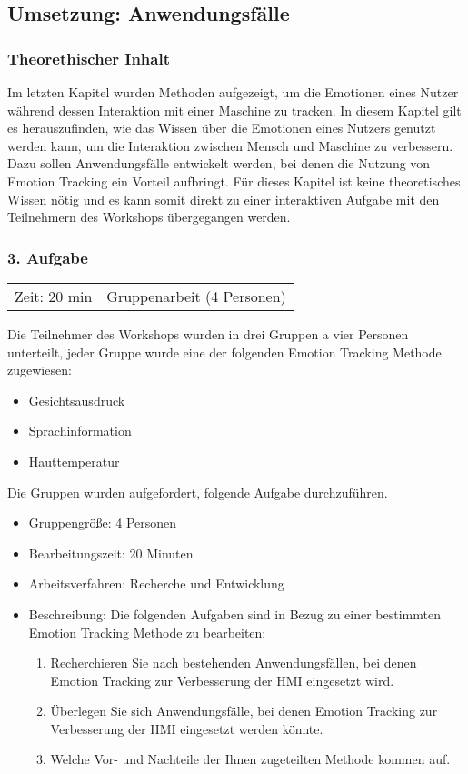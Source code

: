 \subsection{Umsetzung: Anwendungsfälle}\label{Umsetzung_Anwendungsfaelle}
\subsubsection*{Theorethischer Inhalt}
Im letzten Kapitel wurden Methoden aufgezeigt, um die Emotionen eines Nutzer während dessen Interaktion mit einer Maschine zu tracken. In diesem Kapitel gilt es herauszufinden, wie das Wissen über die Emotionen eines Nutzers genutzt werden kann, um die Interaktion zwischen Mensch und Maschine zu verbessern. Dazu sollen Anwendungsfälle entwickelt werden, bei denen die Nutzung von Emotion Tracking ein Vorteil aufbringt. Für dieses Kapitel ist keine theoretisches Wissen nötig und es kann somit direkt zu einer interaktiven Aufgabe mit den Teilnehmern des Workshops übergegangen werden.
\newline
\subsubsection*{3. Aufgabe}
\begin{tabular}{c c }
	Zeit: 20 min & Gruppenarbeit (4 Personen)\\
\end{tabular}

Die Teilnehmer des Workshops wurden in drei Gruppen a vier Personen unterteilt, jeder Gruppe wurde eine der folgenden Emotion Tracking Methode zugewiesen:
\begin{itemize}
	\item Gesichtsausdruck
	\item Sprachinformation
	\item Hauttemperatur
\end{itemize}
Die Gruppen wurden aufgefordert, folgende Aufgabe durchzuführen.
\begin{itemize}
	\item Gruppengröße: 4 Personen
	\item Bearbeitungszeit: 20 Minuten
	\item Arbeitsverfahren: Recherche und Entwicklung
	\item Beschreibung: Die folgenden Aufgaben sind in Bezug zu einer bestimmten Emotion Tracking Methode zu bearbeiten:
	\begin{enumerate}
		\item Recherchieren Sie nach bestehenden Anwendungsfällen, bei denen Emotion Tracking zur Verbesserung der HMI eingesetzt wird.
		\item Überlegen Sie sich Anwendungsfälle, bei denen Emotion Tracking zur Verbesserung der HMI eingesetzt werden könnte.
		\item Welche Vor- und Nachteile der Ihnen zugeteilten Methode kommen auf.
	\end{enumerate}
\end{itemize}

